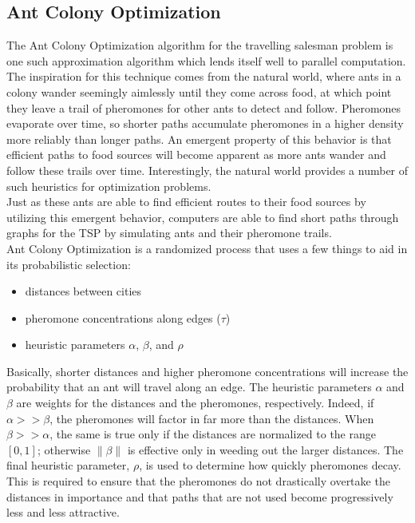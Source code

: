\documentclass[twocolumn]{article}
\begin{document}
\subsection{Ant Colony Optimization} \label{sub:aco}

The Ant Colony Optimization algorithm for the travelling salesman problem is one
such approximation algorithm which lends itself well to parallel computation.
The inspiration for this technique comes from the natural world, where ants in a
colony wander seemingly aimlessly until they come across food, at which point
they leave a trail of pheromones for other ants to detect and follow. Pheromones
evaporate over time, so shorter paths accumulate pheromones in a higher density 
more reliably than longer paths. An emergent property of this behavior is that 
efficient paths to food sources will become apparent as more ants wander and 
follow these trails over time. Interestingly, the natural world provides a number
of such heuristics for optimization problems.\\

Just as these ants are able to find efficient routes to their food sources by
utilizing this emergent behavior, computers are able to find short paths through
graphs for the TSP by simulating ants and their pheromone trails. \\

Ant Colony Optimization is a randomized process that uses a few things to aid
in its probabilistic selection:
\begin{itemize}
\item distances between cities
\item pheromone concentrations along edges ($\tau$)
\item heuristic parameters $\alpha$, $\beta$, and $\rho$
\end{itemize}
Basically, shorter distances and higher pheromone concentrations will increase the probability
that an ant will travel along an edge. The heuristic parameters $\alpha$ and $\beta$ are 
weights for the distances and the pheromones, respectively. Indeed, if $\alpha >> \beta$, the 
pheromones will factor in far more than the distances. When $\beta >> \alpha$, the same is true 
only if the distances are normalized to the range $[0,1]$; otherwise $\|\beta\|$ is effective 
only in weeding out the larger distances. The final heuristic parameter, $\rho$, is used to 
determine how quickly pheromones decay. This is required to ensure that the pheromones do not
drastically overtake the distances in importance and that paths that are not used become 
progressively less and less attractive. \\
\end{document}
